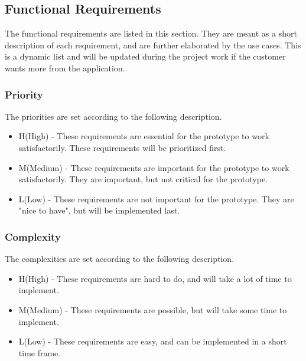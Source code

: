 \subsection{Functional Requirements}
The functional requirements are listed in this section.
They are meant as a short description of each requirement,
and are further elaborated by the use cases.
This is a dynamic list and will be updated during the project work if the customer wants more from the application.

\subsubsection{Priority}
The priorities are set according to the following description.
\begin{itemize}
	 \item H(High) - These requirements are essential for the prototype to work satisfactorily. These requirements will be prioritized first.
	\item M(Medium) - These requirements are important for the prototype to work satisfactorily. They are important, but not critical for the prototype.
	\item L(Low) - These requirements are not important for the prototype. They are "nice to have", but will be implemented last.
\end{itemize}

\subsubsection{Complexity}
The complexities are set according to the following description.
\begin{itemize}
	\item H(High) - These requirements are hard to do, and will take a lot of time to implement.
	\item M(Medium) - These requirements are possible, but will take some time to implement.
	\item L(Low) - These requirements are easy, and can be implemented in a short time frame.
\end{itemize}

